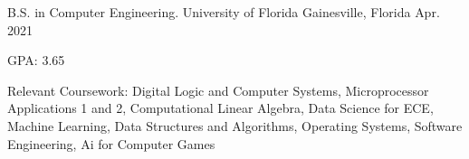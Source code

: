


\begin{cventries}


\cventry
{B.S. in Computer Engineering.} %
{University of Florida} %
{Gainesville, Florida} %
{Apr. 2021} %
{ %
\begin{cvitems}
\item {GPA: 3.65}
\item Relevant Coursework:
\setlength{\parindent}{.125in}
\newline
Digital Logic and Computer Systems, Microprocessor Applications 1 and 2, Computational Linear Algebra, Data Science for ECE, 
\newline
Machine Learning, Data Structures and Algorithms, Operating Systems, Software Engineering, Ai for Computer Games
\end{cvitems}
}


\end{cventries}
